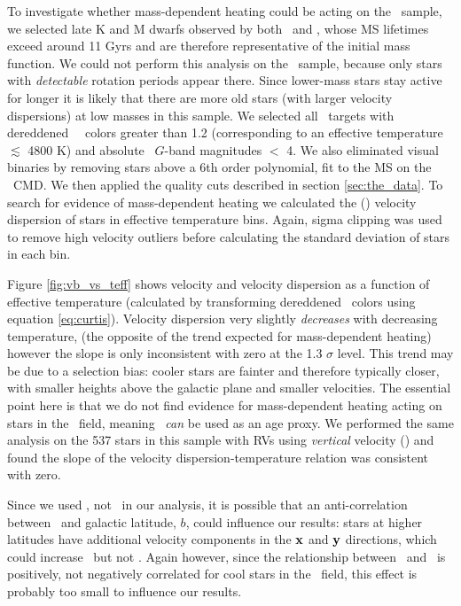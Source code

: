 To investigate whether mass-dependent heating could be acting on the \kepler\
sample, we selected late K and M dwarfs observed by both \kepler\ and \gaia,
whose MS lifetimes exceed around 11 Gyrs and are therefore representative of
the initial mass function.
We could not perform this analysis on the \mct\ sample, because only stars
with {\it detectable} rotation periods appear there.
Since lower-mass stars stay active for longer it is likely that there are more
old stars (with larger velocity dispersions) at low masses in this sample.
We selected all \kepler\ targets with dereddened \gaia\ \gcolor\ colors
greater than 1.2 (corresponding to an effective temperature $\lesssim$
4800 K) and absolute \gaia\ $G$-band magnitudes $<$ 4.
We also eliminated visual binaries by removing stars above a 6th order
polynomial, fit to the MS on the \gaia\ CMD.
We then applied the quality cuts described in section \ref{sec:the_data}.
To search for evidence of mass-dependent heating we calculated the (\vb)
velocity dispersion of stars in effective temperature bins.
Again, sigma clipping was used to remove high velocity outliers before
calculating the standard deviation of stars in each bin.

Figure \ref{fig:vb_vs_teff} shows velocity and velocity dispersion
as a function of effective temperature (calculated by transforming dereddened
\gaia\ colors using equation \ref{eq:curtis}).
Velocity dispersion very slightly {\it decreases} with decreasing temperature,
(the opposite of the trend expected for mass-dependent heating) however the
slope is only inconsistent with zero at the 1.3 $\sigma$ level.
This trend may be due to a selection bias: cooler stars are fainter and
therefore typically closer, with smaller heights above the galactic plane and
smaller velocities.
The essential point here is that we do not find  evidence for mass-dependent
heating acting on stars in the \kepler\ field, meaning \sigmavb\ {\it can} be
used as an age proxy.
We performed the same analysis on the 537 stars in this sample with RVs using
{\it vertical} velocity (\vz) and found the slope of the velocity
dispersion-temperature relation was consistent with zero.

Since we used \vb, not \vz\ in our analysis, it is possible that an
anti-correlation between \teff\ and galactic latitude, $b$, could influence
our results: stars at higher latitudes have additional velocity components in
the ${\bf x}$ and ${\bf y}$ directions, which could increase \vb\ but not \vz.
Again however, since the relationship between \sigmavb\ and \teff\ is
positively, not negatively correlated for cool stars in the \kepler\ field,
this effect is probably too small to influence our results.

